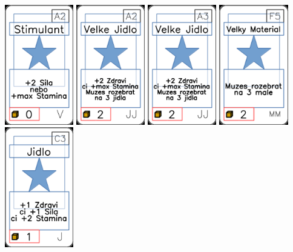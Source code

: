 \documentclass[a4paper]{article}
\begin{document}
	\includegraphics[width=3.0cm]{img-1_61}
	\includegraphics[width=3.0cm]{img-1_31}
	\includegraphics[width=3.0cm]{img-1_32}
	\includegraphics[width=3.0cm]{img-1_59}
	\includegraphics[width=3.0cm]{img-1_12}
\end{document}
